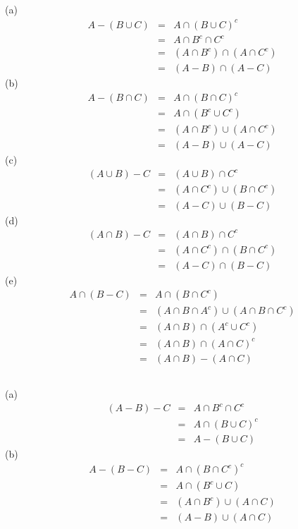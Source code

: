 \documentclass{jsarticle}
\begin{document}
\subsection{}	%
\noindent
(a)
\begin{eqnarray*}
	A - (B \cup C)
	&=& A \cap (B \cup C)^c\\
	&=& A \cap B^c \cap C^c\\
	&=& (A \cap B^c) \cap (A \cap C^c)\\
	&=& (A - B) \cap (A - C)
\end{eqnarray*}
(b)
\begin{eqnarray*}
	A - (B \cap C)
	&=& A \cap (B \cap C)^c\\
	&=& A \cap (B^c \cup C^c)\\
	&=& (A \cap B^c) \cup (A \cap C^c)\\
	&=& (A - B) \cup (A - C)
\end{eqnarray*}
(c)
\begin{eqnarray*}
	(A \cup B) - C
	&=& (A \cup B) \cap C^c\\
	&=& (A \cap C^c) \cup (B \cap C^c)\\
	&=& (A - C) \cup (B - C)
\end{eqnarray*}
(d)
\begin{eqnarray*}
	(A \cap B) - C
	&=& (A \cap B) \cap C^c\\
	&=& (A \cap C^c) \cap (B \cap C^c)\\
	&=& (A - C) \cap (B - C)
\end{eqnarray*}
(e)
\begin{eqnarray*}
	A \cap (B - C)
	&=& A \cap (B \cap C^c)\\
	&=& (A \cap B \cap A^c) \cup (A \cap B \cap C^c)\\
	&=& (A \cap B) \cap (A^c \cup C^c)\\
	&=& (A \cap B) \cap (A \cap C)^c\\
	&=& (A \cap B) - (A \cap C)
\end{eqnarray*}

\subsection{}	%
(a)
\begin{eqnarray*}
	(A - B) - C
	&=& A \cap B^c \cap C^c\\
	&=& A \cap (B \cup C)^c\\
	&=& A - (B \cup C)
\end{eqnarray*}
(b)
\begin{eqnarray*}
	A - (B - C)
	&=& A \cap (B \cap C^c)^c\\
	&=& A \cap (B^c \cup C)\\
	&=& (A \cap B^c) \cup (A \cap C)\\
	&=& (A - B) \cup (A \cap C)
\end{eqnarray*}
\end{document}
